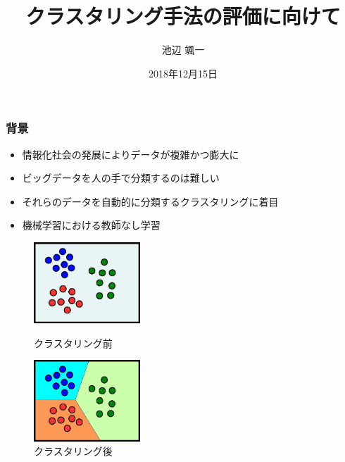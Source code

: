 \documentclass[13pt,dvipdfmx]{beamer}
\title{クラスタリング手法の評価に向けて}
\author{池辺 颯一}
\institute{芝浦工業大学}
\date{2018年12月15日}
\begin{document}
\begin{frame}\frametitle{}
 \titlepage
\end{frame}

\begin{frame}\frametitle{背景}
\begin{itemize}
 \item 情報化社会の発展によりデータが複雑かつ膨大に
 \item ビッグデータを人の手で分類するのは難しい
 \item それらのデータを自動的に分類するクラスタリングに着目
 \item 機械学習における教師なし学習
\end{itemize}
\vspace{5mm}
\begin{figure}[htbp]
 \begin{minipage}{0.4\hsize}
  \begin{center}
   \includegraphics[width=40mm]{before_clustering.png}
  \end{center}
  \captionsetup{labelformat=empty,labelsep=none}
  \caption{クラスタリング前}
  \label{fig:one}
 \end{minipage}
\hspace{1cm}
 \begin{minipage}{0.4\hsize}
  \begin{center}
   \includegraphics[width=40mm]{after_clustering.png}
  \end{center}
  \captionsetup{labelformat=empty,labelsep=none}
  \caption{クラスタリング後}
  \label{fig:two}
 \end{minipage}
\end{figure}

\end{frame}
\end{document}
